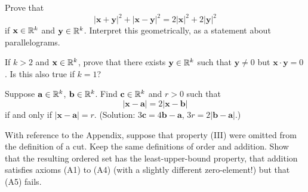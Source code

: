 \begin{myExercise}
    Prove that
    \begin{equation*}
        |\mathbf{x} + \mathbf{y}|^2 + 
        |\mathbf{x} - \mathbf{y}|^2 =
        2|\mathbf{x}|^2 + 2|\mathbf{y}|^2
    \end{equation*}
    if $\mathbf{x} \in {\protect\mathbb R}^k$ and $\mathbf{y} \in {\protect\mathbb R}^k$. Interpret this geometrically, as a statement about parallelograms.
\end{myExercise}

\begin{myExercise}
    If $k >2$ and $\mathbf{x}\in {\protect\mathbb R}^k$, prove that there exists $\mathbf{y} \in {\protect\mathbb R}^k$ such that $\mathbf{y} \neq 0$ but $\mathbf{x}\cdot\mathbf{y} =0$.
    Is this also true if $k =1$?
\end{myExercise}

\begin{myExercise}
    Suppose $\mathbf{a} \in {\protect\mathbb R}^k$, $\mathbf{b} \in{\protect\mathbb R}^k$. Find $\mathbf{c} \in {\protect\mathbb R}^k$ and $r > 0$ such that
    \begin{equation*}
        |\mathbf{x} - \mathbf{a}| = 2|\mathbf{x} - \mathbf{b}|
    \end{equation*}
    if and only if $|\mathbf{x} - \mathbf{a}| = r$.
    (Solution: $3\mathbf{c} =4\mathbf{b}-\mathbf{a}$, $3r =2|\mathbf{b}-\mathbf{a}|$.)
\end{myExercise}

\begin{myExercise}
    With reference to the Appendix, suppose that property (III) were omitted from the
    definition of a cut. Keep the same definitions of order and addition. Show that
    the resulting ordered set has the least-upper-bound property, that addition satisfies
    axioms (A1) to (A4) (with a slightly different zero-element!) but that (A5) fails.
\end{myExercise}
